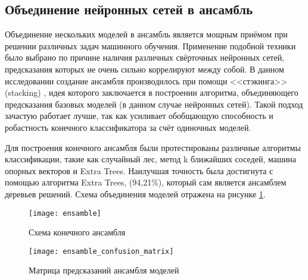 \subsection{Объединение нейронных сетей в ансамбль}
Объединение нескольких моделей в ансамбль является мощным приёмом при решении различных задач машинного обучения.
Применение подобной техники было выбрано по причине наличия различных свёрточных нейронных сетей, предсказания которых
не очень сильно коррелируют между собой. В данном исследовании создание ансамбля производилось при помощи <<стэкинга>> (stacking)
\cite{Wolpert92stackedgeneralization}, идея которого заключается в построении алгоритма, объединяющего
предсказания базовых моделей (в данном случае нейронных сетей). Такой подход зачастую работает лучше, 
так как усиливает обобщающую способность и робастность конечного классификатора за счёт одиночных моделей.

Для построения конечного ансамбля были протестированы различные алгоритмы классификации, такие как случайный лес,
метод k ближайших соседей, машина опорных векторов и Extra Trees.
Наилучшая точность была достигнута с помощью алгоритма Extra Trees,\cite{ExtraTrees} (94,21\%), который сам является ансамблем 
деревьев решений. Схема объединения моделей отражена на рисунке \ref{fig:ansamble}.

\begin{figure}[H]
    \centering
    \texttt{[image: ensamble]}
    \caption{Схема конечного ансамбля}
    \label{fig:ansamble}
\end{figure}

\begin{figure}[H]
    \centering
    \texttt{[image: ensamble\_confusion\_matrix]}
    \vspace*{-1.3cm}
    \caption{Матрица предсказаний ансамбля моделей}
    \label{fig:ensamble_confusion_matrix}
\end{figure}